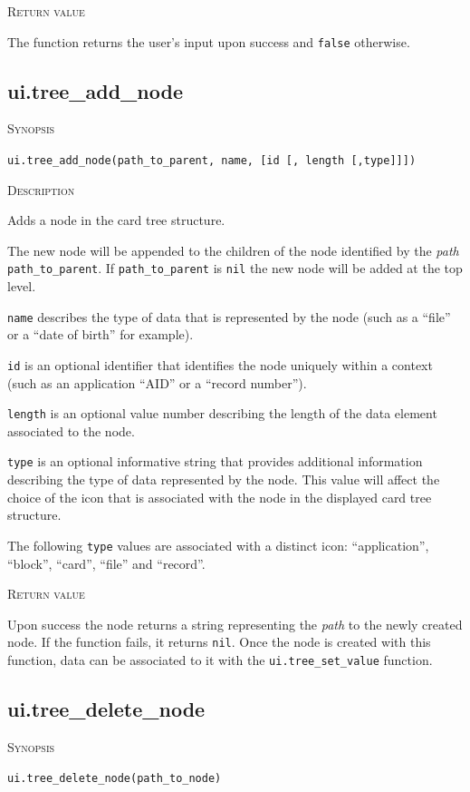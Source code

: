 \documentclass[11pt]{report}
\newcommand{\mansection}[1]{\vspace{0.5em}\par\noindent\textsc{#1}\vspace{0.5em}\par}
\newcommand{\syn}[1]{\texttt{#1}}
\begin{document}
\mansection{Return value}
  The function returns the user's input upon success and \syn{false} otherwise.


\subsection{ui.tree\_add\_node}

\mansection{Synopsis}
\syn{ui.tree\_add\_node(path\_to\_parent, name, [\syn{id} [, \syn{length} [,\syn{type}]]])}

\mansection{Description}
  Adds a node in the card tree structure. 

  The new node will be appended to the children of the node identified by the 
  \emph{path} \syn{path\_to\_parent}.
  If \syn{path\_to\_parent} is \syn{nil} the new node will be added at 
  the top level.

  \syn{name} describes the type of data that is represented by the node 
  (such as a ``file'' or a ``date of birth'' for example). 

  \syn{id} is an optional identifier that identifies the node uniquely within 
  a context (such as an application ``AID'' or a ``record number'').

  \syn{length} is an optional value number describing the length of the 
  data element associated to the node.

  \syn{type} is an optional informative string that provides additional 
  information describing the type of data represented by the node. This value
  will affect the choice of the icon that is associated with the node in the 
  displayed card tree structure. 

  The following \syn{type} values are associated with a distinct icon: ``application'', ``block'', ``card'', ``file'' and ``record''.
  
\mansection{Return value}
  Upon success the node returns a string representing the \emph{path} to the 
  newly created node. 
  If the function fails, it returns \syn{nil}.
  Once the node is created with this function, data can be associated to it with the \syn{ui.tree\_set\_value} function.


\subsection{ui.tree\_delete\_node}

\mansection{Synopsis}
\syn{ui.tree\_delete\_node(path\_to\_node)}
\end{document}
